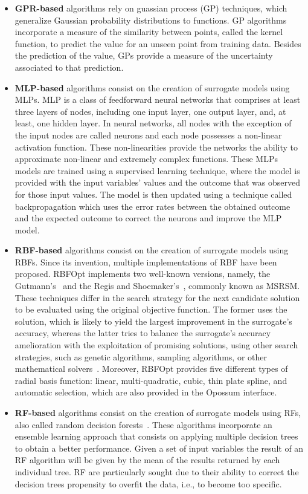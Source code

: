 \begin{itemize}
	\item \textbf{GPR-based} algorithms rely on guassian process (GP) techniques, which generalize Gaussian probability distributions to functions. GP algorithms incorporate a measure of the similarity between points, called the kernel function, to predict the value for an unseen point from training data. Besides the prediction of the value, GPs provide a measure of the uncertainty associated to that prediction.
	
	\item \textbf{MLP-based} algorithms consist on the creation of surrogate models using \acp{MLP}. \ac{MLP} is a class of feedforward neural networks that comprises at least three layers of nodes, including one input layer, one output layer, and, at least, one hidden layer. In neural networks, all nodes with the exception of the input nodes are called neurons and each node possesses a non-linear activation function. These non-linearities provide the networks the ability to approximate non-linear and extremely complex functions. These \acp{MLP} models are trained using a supervised learning technique, where the model is provided with the input variables' values and the outcome that was observed for those input values. The model is then updated using a technique called backpropagation which uses the error rates between the obtained outcome and the expected outcome to correct the neurons and improve the \ac{MLP} model. 
	
	\item \textbf{RBF-based} algorithms consist on the creation of surrogate models using \acp{RBF}. Since its invention, multiple implementations of \ac{RBF} have been proposed. RBFOpt implements two well-known versions, namely, the Gutmann's~\cite{Gutmann2001} and the Regis and Shoemaker's~\cite{Regis2007}, commonly known as MSRSM. These techniques differ in the search strategy for the next candidate solution to be evaluated using the original objective function. The former uses the solution, which is likely to yield the largest improvement in the surrogate's accuracy, whereas the latter tries to balance the surrogate's accuracy amelioration with the exploitation of promising solutions, using other search strategies, such as genetic algorithms, sampling algorithms, or other mathematical solvers~\cite{Wortmann2017Opossum}. Moreover, RBFOpt provides five different types of radial basis function: linear, multi-quadratic, cubic, thin plate spline, and automatic selection, which are also provided in the Opossum interface.
		
	\item \textbf{RF-based} algorithms consist on the creation of surrogate models using \acp{RF}, also called random decision forests~\cite{Ho1995RDF}. These algorithms incorporate an ensemble learning approach that consists on applying multiple decision trees to obtain a better performance. Given a set of input variables the result of an \ac{RF} algorithm will be given by the mean  of the results returned by each individual tree. \ac{RF} are particularly sought due to their ability to correct the decision trees propensity to overfit the data, i.e., to become too specific.
	
\end{itemize}